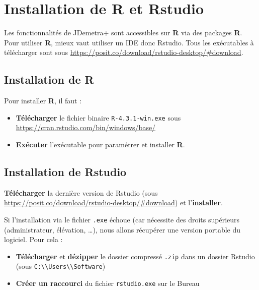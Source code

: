 \documentclass[
]{article}
\providecommand{\tightlist}{%
  \setlength{\itemsep}{0pt}\setlength{\parskip}{0pt}}
\begin{document}
\hypertarget{installation-de-r-et-rstudio}{%
\section{\texorpdfstring{Installation de \textbf{R} et
Rstudio}{Installation de R et Rstudio}}\label{installation-de-r-et-rstudio}}

Les fonctionnalités de JDemetra+ sont accessibles sur \textbf{R} via des
packages \textbf{R}. Pour utiliser \textbf{R}, mieux vaut utiliser un
IDE donc Rstudio. Tous les exécutables à télécharger sont sous
\textcolor{html_color}{\url{https://posit.co/download/rstudio-desktop/\#download}}.

\hypertarget{installation-de-r}{%
\subsection{\texorpdfstring{Installation de
\textbf{R}}{Installation de R}}\label{installation-de-r}}

Pour installer \textbf{R}, il faut :

\begin{itemize}
\tightlist
\item
  \textbf{Télécharger} le fichier binaire \texttt{R-4.3.1-win.exe} sous
  \textcolor{html_color}{\url{https://cran.rstudio.com/bin/windows/base/}}
\item
  \textbf{Exécuter} l'exécutable pour paramétrer et installer
  \textbf{R}.
\end{itemize}

\hypertarget{installation-de-rstudio}{%
\subsection{Installation de Rstudio}\label{installation-de-rstudio}}

\textbf{Télécharger} la dernière version de Rstudio (sous
\textcolor{html_color}{\url{https://posit.co/download/rstudio-desktop/\#download}})
et l'\textbf{installer}.

Si l'installation via le fichier \texttt{.exe} échoue (car nécessite des
droits supérieurs (administrateur, élévation, \ldots), nous allons
récupérer une version portable du logiciel. Pour cela :

\begin{itemize}
\tightlist
\item
  \textbf{Télécharger} et \textbf{dézipper} le dossier compressé
  \texttt{.zip} dans un dossier Rstudio (sous
  \textcolor{windows_path_color}{\nolinkurl{C:\\Users\\Software}})
\item
  \textbf{Créer un raccourci} du fichier \texttt{rstudio.exe} sur le
  Bureau
\end{itemize}
\end{document}
